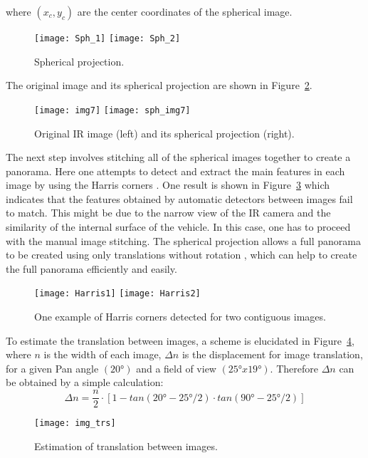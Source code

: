 \documentclass{tQRT2e}
\begin{document}
where $ (x_c,y_c) $ are the center coordinates of the spherical image.
\begin{figure}[ht]
	\centering
	\texttt{[image: Sph\_1]}
	\texttt{[image: Sph\_2]}
	\caption{Spherical projection.}
	\label{Sph_pro}
\end{figure}

The original image and its spherical projection are shown in Figure~\ref{Orig_sph}.
\begin{figure}[ht]
	\centering
	\texttt{[image: img7]}
	\texttt{[image: sph\_img7]}
	\caption{Original IR image (left) and its spherical projection (right).}
	\label{Orig_sph}
\end{figure}

The next step involves stitching all of the spherical images together to create a panorama. Here one attempts to detect and extract the main features in each image by using the Harris corners \cite{Harris1988}. One result is shown in Figure~\ref{Harris} which indicates that the features obtained by automatic detectors between images fail to match. This might be due to the narrow view of the IR camera and the similarity of the internal surface of the vehicle. In this case, one has to proceed with the manual image stitching.  The spherical projection allows a full panorama to be created using only translations without rotation \cite{Szeliski1997}, which can help to create the full panorama efficiently and easily.
\begin{figure}[ht]
	\texttt{[image: Harris1]}
	\texttt{[image: Harris2]}
	\caption{One example of Harris corners detected for two contiguous images.}
	\label{Harris}
\end{figure}

To estimate the translation between images, a scheme is elucidated in Figure~\ref{Trans}, where $ n $ is the width of each image, $ \Delta n $ is the displacement for image translation, for a given Pan angle $ (20°) $ and a field of view $ (25°x19°) $. Therefore $ \Delta n $ can be obtained by a simple calculation:
\begin{equation}
\Delta n=\dfrac{n}{2}⋅[1-tan(20°-25°/2)\cdot tan(90°-25°/2)]
\end{equation}

\begin{figure}[ht]
	\centering
	\texttt{[image: img\_trs]}
	\caption{ Estimation of translation between images.}
	\label{Trans}
\end{figure}
\end{document}
